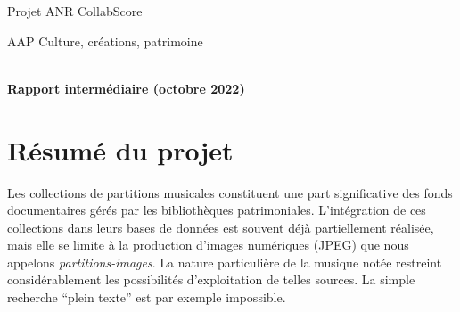 \documentclass[11pt]{article}
\begin{document}
\title{\textbf{ {}}}
\author{}
\date{\empty}



\thispagestyle{empty}

\begin{center}
\vspace*{1cm}
{\huge Projet ANR CollabScore}

\vspace{+1cm}

{\Large AAP Culture, créations, patrimoine \\
~\vspace*{0.2cm}
}

\vspace{+1cm}
{\huge\bf Rapport intermédiaire (octobre 2022)}

\vspace{+1cm}

\end{center}


\begin{small}
\tableofcontents
\end{small}

\newpage


\section{Résumé du projet}

Les collections de partitions musicales constituent une part 
significative des fonds documentaires gérés par les bibliothèques patrimoniales. 
L’intégration de ces collections dans leurs bases de données est souvent déjà partiellement réalisée, 
mais elle se limite à la production d’images numériques (JPEG) que nous appelons \emph{partitions-images}. 
La nature particulière de la musique notée restreint considérablement les possibilités 
d’exploitation de telles sources. La simple recherche “plein texte” est par exemple impossible. 
\end{document}
